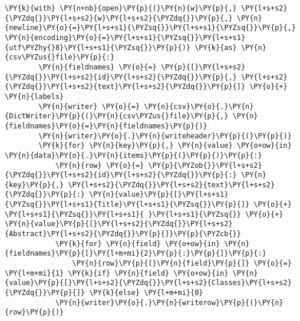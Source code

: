 \documentclass[../main.tex]{subfiles}
\begin{document}
\begin{tcolorbox}[breakable, size=fbox, boxrule=1pt, pad at break*=1mm,colback=cellbackground, colframe=cellborder]
\begin{Verbatim}[commandchars=\\\{\}]
    \PY{k}{with} \PY{n+nb}{open}\PY{p}{(}\PY{n}{w}\PY{p}{,} \PY{l+s+s2}{\PYZdq{}}\PY{l+s+s2}{w}\PY{l+s+s2}{\PYZdq{}}\PY{p}{,} \PY{n}{newline}\PY{o}{=}\PY{l+s+s1}{\PYZsq{}}\PY{l+s+s1}{\PYZsq{}}\PY{p}{,} \PY{n}{encoding}\PY{o}{=}\PY{l+s+s1}{\PYZsq{}}\PY{l+s+s1}{utf\PYZhy{}8}\PY{l+s+s1}{\PYZsq{}}\PY{p}{)} \PY{k}{as} \PY{n}{csv\PYZus{}file}\PY{p}{:}
        \PY{n}{fieldnames} \PY{o}{=} \PY{p}{[}\PY{l+s+s2}{\PYZdq{}}\PY{l+s+s2}{id}\PY{l+s+s2}{\PYZdq{}}\PY{p}{,} \PY{l+s+s2}{\PYZdq{}}\PY{l+s+s2}{text}\PY{l+s+s2}{\PYZdq{}}\PY{p}{]} \PY{o}{+} \PY{n}{labels}
        \PY{n}{writer} \PY{o}{=} \PY{n}{csv}\PY{o}{.}\PY{n}{DictWriter}\PY{p}{(}\PY{n}{csv\PYZus{}file}\PY{p}{,} \PY{n}{fieldnames}\PY{o}{=}\PY{n}{fieldnames}\PY{p}{)}
        \PY{n}{writer}\PY{o}{.}\PY{n}{writeheader}\PY{p}{(}\PY{p}{)}
        \PY{k}{for} \PY{n}{key}\PY{p}{,} \PY{n}{value} \PY{o+ow}{in} \PY{n}{data}\PY{o}{.}\PY{n}{items}\PY{p}{(}\PY{p}{)}\PY{p}{:}
            \PY{n}{row} \PY{o}{=} \PY{p}{\PYZob{}}\PY{l+s+s2}{\PYZdq{}}\PY{l+s+s2}{id}\PY{l+s+s2}{\PYZdq{}}\PY{p}{:} \PY{n}{key}\PY{p}{,} \PY{l+s+s2}{\PYZdq{}}\PY{l+s+s2}{text}\PY{l+s+s2}{\PYZdq{}}\PY{p}{:} \PY{n}{value}\PY{p}{[}\PY{l+s+s1}{\PYZsq{}}\PY{l+s+s1}{Title}\PY{l+s+s1}{\PYZsq{}}\PY{p}{]} \PY{o}{+} \PY{l+s+s1}{\PYZsq{}}\PY{l+s+s1}{ }\PY{l+s+s1}{\PYZsq{}} \PY{o}{+} \PY{n}{value}\PY{p}{[}\PY{l+s+s2}{\PYZdq{}}\PY{l+s+s2}{Abstract}\PY{l+s+s2}{\PYZdq{}}\PY{p}{]}\PY{p}{\PYZcb{}}
            \PY{k}{for} \PY{n}{field} \PY{o+ow}{in} \PY{n}{fieldnames}\PY{p}{[}\PY{l+m+mi}{2}\PY{p}{:}\PY{p}{]}\PY{p}{:}
                \PY{n}{row}\PY{p}{[}\PY{n}{field}\PY{p}{]} \PY{o}{=} \PY{l+m+mi}{1} \PY{k}{if} \PY{n}{field} \PY{o+ow}{in} \PY{n}{value}\PY{p}{[}\PY{l+s+s2}{\PYZdq{}}\PY{l+s+s2}{Classes}\PY{l+s+s2}{\PYZdq{}}\PY{p}{]} \PY{k}{else} \PY{l+m+mi}{0}
            \PY{n}{writer}\PY{o}{.}\PY{n}{writerow}\PY{p}{(}\PY{n}{row}\PY{p}{)}



\end{Verbatim}
\end{tcolorbox}
\end{document}

